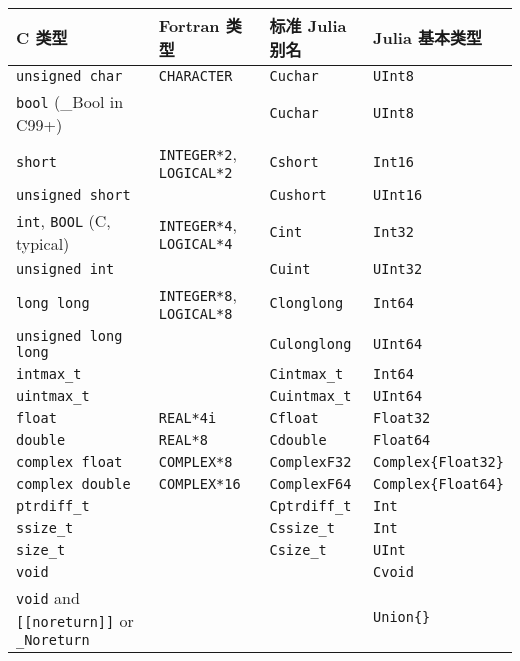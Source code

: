 \begin{table}[h]

\begin{tabulary}{\linewidth}{|L|L|L|L|}
\hline
C 类型 & Fortran 类型 & 标准 Julia 别名 & Julia 基本类型 \\
\hline
\texttt{unsigned char} & \texttt{CHARACTER} & \texttt{Cuchar} & \texttt{UInt8} \\
\hline
\texttt{bool} (\_Bool in C99+) &  & \texttt{Cuchar} & \texttt{UInt8} \\
\hline
\texttt{short} & \texttt{INTEGER*2}, \texttt{LOGICAL*2} & \texttt{Cshort} & \texttt{Int16} \\
\hline
\texttt{unsigned short} &  & \texttt{Cushort} & \texttt{UInt16} \\
\hline
\texttt{int}, \texttt{BOOL} (C, typical) & \texttt{INTEGER*4}, \texttt{LOGICAL*4} & \texttt{Cint} & \texttt{Int32} \\
\hline
\texttt{unsigned int} &  & \texttt{Cuint} & \texttt{UInt32} \\
\hline
\texttt{long long} & \texttt{INTEGER*8}, \texttt{LOGICAL*8} & \texttt{Clonglong} & \texttt{Int64} \\
\hline
\texttt{unsigned long long} &  & \texttt{Culonglong} & \texttt{UInt64} \\
\hline
\texttt{intmax\_t} &  & \texttt{Cintmax\_t} & \texttt{Int64} \\
\hline
\texttt{uintmax\_t} &  & \texttt{Cuintmax\_t} & \texttt{UInt64} \\
\hline
\texttt{float} & \texttt{REAL*4i} & \texttt{Cfloat} & \texttt{Float32} \\
\hline
\texttt{double} & \texttt{REAL*8} & \texttt{Cdouble} & \texttt{Float64} \\
\hline
\texttt{complex float} & \texttt{COMPLEX*8} & \texttt{ComplexF32} & \texttt{Complex\{Float32\}} \\
\hline
\texttt{complex double} & \texttt{COMPLEX*16} & \texttt{ComplexF64} & \texttt{Complex\{Float64\}} \\
\hline
\texttt{ptrdiff\_t} &  & \texttt{Cptrdiff\_t} & \texttt{Int} \\
\hline
\texttt{ssize\_t} &  & \texttt{Cssize\_t} & \texttt{Int} \\
\hline
\texttt{size\_t} &  & \texttt{Csize\_t} & \texttt{UInt} \\
\hline
\texttt{void} &  &  & \texttt{Cvoid} \\
\hline
\texttt{void} and \texttt{[[noreturn]]} or \texttt{\_Noreturn} &  &  & \texttt{Union\{\}} \\

\end{tabulary}
\end{table}
